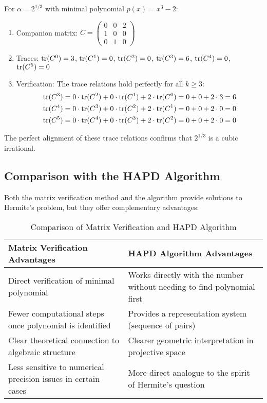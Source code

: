 \begin{example}
For $\alpha = 2^{1/3}$ with minimal polynomial $p(x) = x^3 - 2$:
\begin{enumerate}
    \item Companion matrix: $C = \begin{pmatrix} 0 & 0 & 2 \\ 1 & 0 & 0 \\ 0 & 1 & 0 \end{pmatrix}$
    \item Traces: $\operatorname{tr}(C^0) = 3$, $\operatorname{tr}(C^1) = 0$, $\operatorname{tr}(C^2) = 0$, $\operatorname{tr}(C^3) = 6$, $\operatorname{tr}(C^4) = 0$, $\operatorname{tr}(C^5) = 0$
    \item Verification: The trace relations hold perfectly for all $k \geq 3$:
    \begin{align*}
        \operatorname{tr}(C^3) &= 0 \cdot \operatorname{tr}(C^2) + 0 \cdot \operatorname{tr}(C^1) + 2 \cdot \operatorname{tr}(C^0) = 0 + 0 + 2 \cdot 3 = 6 \\
        \operatorname{tr}(C^4) &= 0 \cdot \operatorname{tr}(C^3) + 0 \cdot \operatorname{tr}(C^2) + 2 \cdot \operatorname{tr}(C^1) = 0 + 0 + 2 \cdot 0 = 0 \\
        \operatorname{tr}(C^5) &= 0 \cdot \operatorname{tr}(C^4) + 0 \cdot \operatorname{tr}(C^3) + 2 \cdot \operatorname{tr}(C^2) = 0 + 0 + 2 \cdot 0 = 0
    \end{align*}
\end{enumerate}
The perfect alignment of these trace relations confirms that $2^{1/3}$ is a cubic irrational.
\end{example}

\subsection{Comparison with the HAPD Algorithm}

Both the matrix verification method and the \HAPD{} algorithm provide solutions to Hermite's problem, but they offer complementary advantages:

\begin{table}[h]
\centering
\caption{Comparison of Matrix Verification and HAPD Algorithm}
\label{tab:comparison}
\begin{tabular}{|p{}|p{}|}
\hline
\textbf{Matrix Verification Advantages} & \textbf{HAPD Algorithm Advantages} \\
\hline
Direct verification of minimal polynomial & Works directly with the number without needing to find polynomial first \\
\hline
Fewer computational steps once polynomial is identified & Provides a representation system (sequence of pairs) \\
\hline
Clear theoretical connection to algebraic structure & Clearer geometric interpretation in projective space \\
\hline
Less sensitive to numerical precision issues in certain cases & More direct analogue to the spirit of Hermite's question \\
\hline
\end{tabular}
\end{table}

